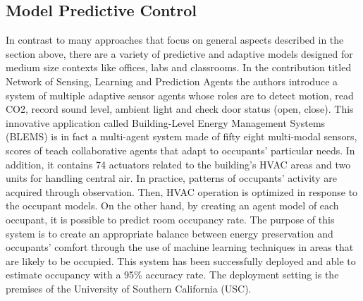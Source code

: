 \subsection{Model Predictive Control}
In contrast to many approaches that focus on general aspects described in the section above, there are a variety of predictive and adaptive models designed for medium size contexts like offices, labs and classrooms. In the contribution titled Network of Sensing, Learning and Prediction Agents  \cite{MamidiChangMaheswaran} the authors introduce a system of multiple adaptive sensor agents whose roles are to detect motion, read CO2, record sound level, ambient light and check door status (open, close). This innovative application called Building-Level Energy Management Systems (BLEMS) is in fact a multi-agent system made of fifty eight multi-modal sensors, scores of teach collaborative agents that adapt to occupants’ particular needs. In addition, it contains 74 actuators related to the building’s HVAC areas and two units for handling central air. In practice, patterns of occupants’ activity are acquired through observation. Then, HVAC operation is optimized in response to the occupant models. On the other hand, by creating an agent model of each occupant, it is possible to predict room occupancy rate. The purpose of this system is to create an appropriate balance between energy preservation and occupants’ comfort through the use of machine learning techniques in areas that are likely to be occupied. This system has been successfully deployed and able to estimate occupancy with a 95\% accuracy rate. The deployment setting is the premises of the University of Southern California (USC).

